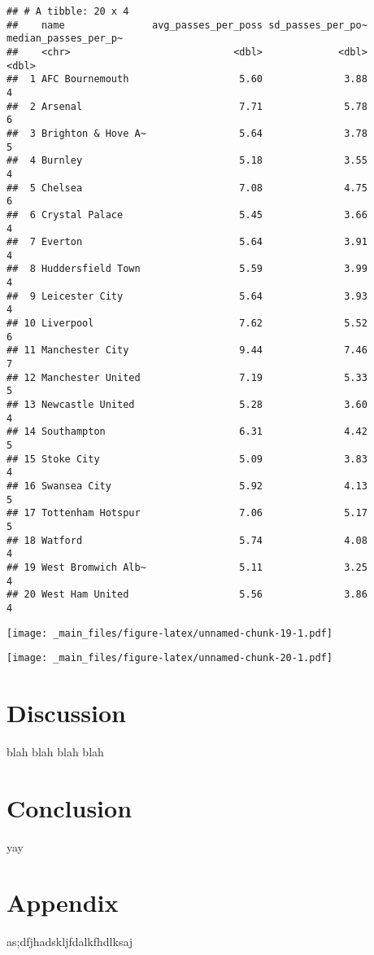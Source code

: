 \documentclass[]{book}
\begin{document}
\begin{verbatim}
## # A tibble: 20 x 4
##    name               avg_passes_per_poss sd_passes_per_po~ median_passes_per_p~
##    <chr>                            <dbl>             <dbl>                <dbl>
##  1 AFC Bournemouth                   5.60              3.88                    4
##  2 Arsenal                           7.71              5.78                    6
##  3 Brighton & Hove A~                5.64              3.78                    5
##  4 Burnley                           5.18              3.55                    4
##  5 Chelsea                           7.08              4.75                    6
##  6 Crystal Palace                    5.45              3.66                    4
##  7 Everton                           5.64              3.91                    4
##  8 Huddersfield Town                 5.59              3.99                    4
##  9 Leicester City                    5.64              3.93                    4
## 10 Liverpool                         7.62              5.52                    6
## 11 Manchester City                   9.44              7.46                    7
## 12 Manchester United                 7.19              5.33                    5
## 13 Newcastle United                  5.28              3.60                    4
## 14 Southampton                       6.31              4.42                    5
## 15 Stoke City                        5.09              3.83                    4
## 16 Swansea City                      5.92              4.13                    5
## 17 Tottenham Hotspur                 7.06              5.17                    5
## 18 Watford                           5.74              4.08                    4
## 19 West Bromwich Alb~                5.11              3.25                    4
## 20 West Ham United                   5.56              3.86                    4
\end{verbatim}

\texttt{[image: \_main\_files/figure-latex/unnamed-chunk-19-1.pdf]}

\texttt{[image: \_main\_files/figure-latex/unnamed-chunk-20-1.pdf]}

\hypertarget{discussion}{%
\chapter{Discussion}\label{discussion}}

blah blah blah blah

\hypertarget{conclusion}{%
\chapter{Conclusion}\label{conclusion}}

yay

\hypertarget{appendix}{%
\chapter{Appendix}\label{appendix}}

as;dfjhadskljfdalkfhdlksaj


\end{document}
